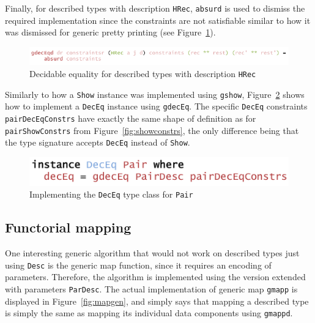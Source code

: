 \documentclass{ituthesis}
\newcommand{\ttconstructor}[1]{\textcolor{constructor-color}{\texttt{#1}}}
\newcommand{\tttype}[1]{\textcolor{type-color}{\texttt{#1}}}
\newcommand{\ttdec}[1]{\textcolor{declared-var-color}{\texttt{#1}}}
\theoremstyle{break}
\begin{document}
Finally, for described types with description \ttconstructor{HRec}, \ttdec{absurd} is used to dismiss the required implementation since the constraints are not satisfiable similar to
how it was dismissed for generic pretty printing (see Figure~\ref{fig:deceqgendesc4}).

\begin{figure}[ht]
\begin{center}
    \includegraphics[scale=0.5]{Figures/GenericDecEqDesc4.png}
\end{center}
\caption{Decidable equality for described types with description \ttconstructor{HRec}}
\label{fig:deceqgendesc4}
\end{figure}

Similarly to how a \tttype{Show} instance was implemented using \ttdec{gshow}, Figure~\ref{fig:deceqinst} shows how to implement a \tttype{DecEq} instance using
\ttdec{gdecEq}. The specific \tttype{DecEq} constraints \ttdec{pairDecEqConstrs} have exactly the same shape of definition as for \ttdec{pairShowConstrs} from Figure~\ref{fig:showconstrs}, the only difference
being that the type signature accepts \tttype{DecEq} instead of \tttype{Show}.

\begin{figure}[ht]
\begin{center}
    \includegraphics[scale=0.5]{Figures/GenericDecEqInstance.png}
\end{center}
\caption{Implementing the \tttype{DecEq} type class for \ttdec{Pair}}
\label{fig:deceqinst}
\end{figure}

\subsection{Functorial mapping}
\label{sub:Functorial mapping}
One interesting generic algorithm that would not work on described types just using \tttype{Desc} is the generic map function, since it requires
an encoding of parameters.
Therefore, the algorithm is implemented using the version extended with parameters \tttype{ParDesc}.
The actual implementation of generic map \ttdec{gmapp} is displayed in Figure~\ref{fig:mapgen}, and simply says that
mapping a described type is simply the same as mapping its individual data components using \ttdec{gmappd}.
\end{document}
